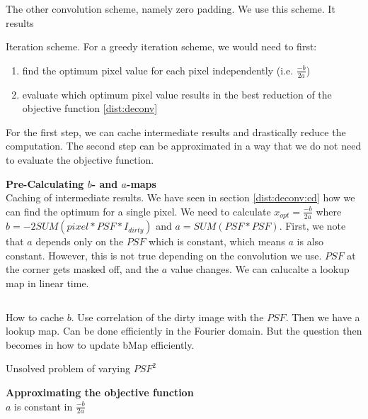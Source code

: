 The other convolution scheme, namely zero padding. We use this scheme. It results 

Iteration scheme. For a greedy iteration scheme, we would need to first:
\begin{enumerate}
	\item find the optimum pixel value for each pixel independently (i.e. $\frac{-b}{2a}$)
	\item evaluate which optimum pixel value results in the best reduction of the objective function \eqref{dist:deconv}
\end{enumerate}

For the first step, we can cache intermediate results and drastically reduce the computation. The second step can be approximated in a way that we do not need to evaluate the objective function.

\textbf{Pre-Calculating $b$- and $a$-maps}\\
Caching of intermediate results. We have seen in section \ref{dist:deconv:cd} how we can find the optimum for a single pixel. We need to calculate  $x_{opt} = \frac{-b}{2a}$ where  $b = -2 SUM( pixel*PSF*I_{dirty})$ and $a = SUM(PSF * PSF)$. First, we note that $a$ depends only on the $PSF$ which is constant, which means $a$ is also constant. However, this is not true depending on the convolution we use.
$PSF$ at the corner gets masked off, and the $a$ value changes.
We can calucalte a lookup map in linear time.
\begin{lstlisting}

\end{lstlisting}

How to cache $b$. Use correlation of the dirty image with the $PSF$. Then we have a lookup map. Can be done efficiently in the Fourier domain. But the question then becomes in how to update bMap efficiently.


Unsolved problem of varying $PSF^2$

\textbf{Approximating the objective function}\\
$a$ is constant in $\frac{-b}{2a}$



